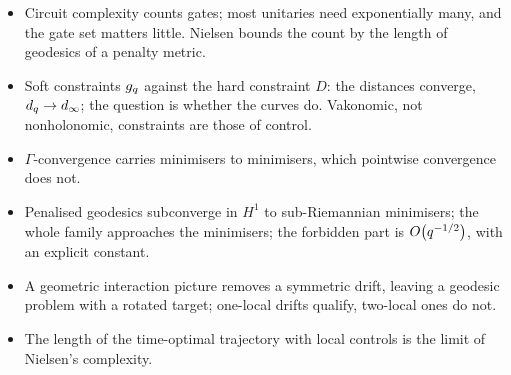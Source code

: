 \documentclass[handoutsbeamer.tex]{subfiles}
\begin{document}
\begin{frame}\mop{\small}
\begin{itemize}\setlength\itemsep{0.4em}
    \item Circuit complexity counts gates; most unitaries need exponentially many, and the gate set matters little. Nielsen bounds the count by the length of geodesics of a penalty metric.
    \item Soft constraints $g_{q}$ against the hard constraint $D$: the distances converge, $d_q\to d_{\infty}$; the question is whether the curves do. Vakonomic, not nonholonomic, constraints are those of control.
    \item $\Gamma$-convergence carries minimisers to minimisers, which pointwise convergence does not.
    \item Penalised geodesics subconverge in $H^1$ to sub-Riemannian minimisers; the whole family approaches the minimisers; the forbidden part is $O\!\left(q^{-1/2}\right)$, with an explicit constant.
    \item A geometric interaction picture removes a symmetric drift, leaving a geodesic problem with a rotated target; one-local drifts qualify, two-local ones do not.
    \item The length of the time-optimal trajectory with local controls is the limit of Nielsen's complexity.
\end{itemize}
\end{frame}

\biblio
\end{document}
